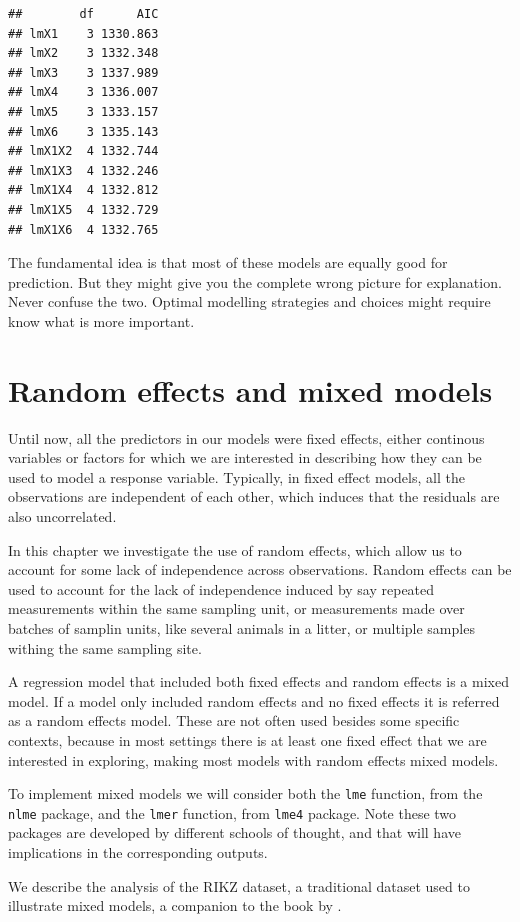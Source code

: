 \documentclass[
]{book}
\begin{document}
\begin{verbatim}
##        df      AIC
## lmX1    3 1330.863
## lmX2    3 1332.348
## lmX3    3 1337.989
## lmX4    3 1336.007
## lmX5    3 1333.157
## lmX6    3 1335.143
## lmX1X2  4 1332.744
## lmX1X3  4 1332.246
## lmX1X4  4 1332.812
## lmX1X5  4 1332.729
## lmX1X6  4 1332.765
\end{verbatim}

The fundamental idea is that most of these models are equally good for prediction. But they might give you the complete wrong picture for explanation. Never confuse the two. Optimal modelling strategies and choices might require know what is more important.

\chapter{Random effects and mixed models}\label{GLMM}

Until now, all the predictors in our models were fixed effects, either continous variables or factors for which we are interested in describing how they can be used to model a response variable. Typically, in fixed effect models, all the observations are independent of each other, which induces that the residuals are also uncorrelated.

In this chapter we investigate the use of random effects, which allow us to account for some lack of independence across observations. Random effects can be used to account for the lack of independence induced by say repeated measurements within the same sampling unit, or measurements made over batches of samplin units, like several animals in a litter, or multiple samples withing the same sampling site.

A regression model that included both fixed effects and random effects is a mixed model. If a model only included random effects and no fixed effects it is referred as a random effects model. These are not often used besides some specific contexts, because in most settings there is at least one fixed effect that we are interested in exploring, making most models with random effects mixed models.

To implement mixed models we will consider both the \texttt{lme} function, from the \texttt{nlme} package, and the \texttt{lmer} function, from \texttt{lme4} package. Note these two packages are developed by different schools of thought, and that will have implications in the corresponding outputs.

We describe the analysis of the RIKZ dataset, a traditional dataset used to illustrate mixed models, a companion to the book by \citet{Zuur2009b}.
\end{document}
